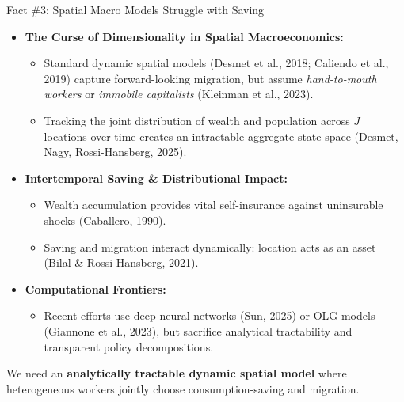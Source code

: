 \documentclass[aspectratio=169, 10pt]{beamer}
\begin{document}
\begin{frame}{Fact \#3: Spatial Macro Models Struggle with Saving \hfill \hyperlink{backup:lit_taxonomy}{\scriptsize{}}}\label{main:fact3}
    \begin{itemize}\small
        \item \textbf{The Curse of Dimensionality in Spatial Macroeconomics:}
        \begin{itemize}\footnotesize
            \item Standard dynamic spatial models (Desmet et al., 2018; Caliendo et al., 2019) capture forward-looking migration, but assume \textit{hand-to-mouth workers} or \textit{immobile capitalists} (Kleinman et al., 2023).
            \item Tracking the joint distribution of wealth and population across $J$ locations over time creates an intractable aggregate state space (Desmet, Nagy, Rossi-Hansberg, 2025).
        \end{itemize}
        \vspace{0.05cm}
        \item \textbf{Intertemporal Saving \& Distributional Impact:}
        \begin{itemize}\footnotesize
            \item Wealth accumulation provides vital self-insurance against uninsurable shocks (Caballero, 1990).
            \item Saving and migration interact dynamically: location acts as an asset (Bilal \& Rossi-Hansberg, 2021).
        \end{itemize}
        \vspace{0.05cm}
        \item \textbf{Computational Frontiers:}
        \begin{itemize}\footnotesize
            \item Recent efforts use deep neural networks (Sun, 2025) or OLG models (Giannone et al., 2023), but sacrifice analytical tractability and transparent policy decompositions.
        \end{itemize}
    \end{itemize}
    \vspace{0.08cm}
    \begin{tcolorbox}[takeawaybox, title=The Challenge]
        \footnotesize We need an \textbf{analytically tractable dynamic spatial model} where heterogeneous workers jointly choose consumption-saving and migration.
    \end{tcolorbox}
\end{frame}
\end{document}
